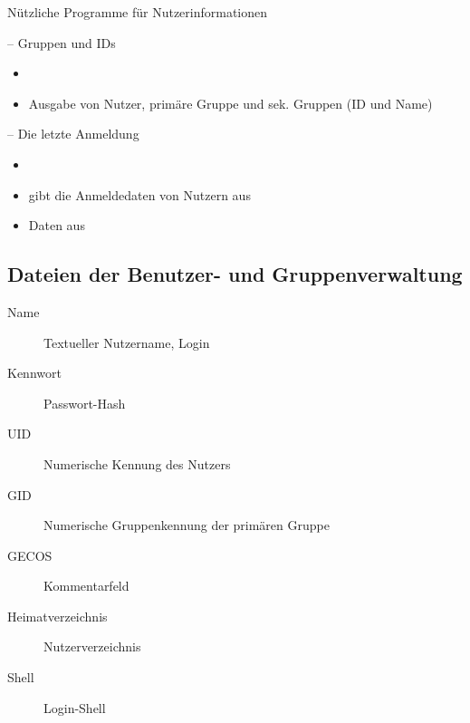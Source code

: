 \documentclass[aspectratio=43]{beamer}
\begin{document}
\begin{frame}{Nützliche Programme für Nutzerinformationen}
  
  \begin{block}{ -- Gruppen und IDs}
    \begin{itemize}
      \item {}
      \item Ausgabe von Nutzer, primäre Gruppe und sek. Gruppen (ID und Name)
    \end{itemize}
  \end{block}
    \begin{block}{ -- Die letzte Anmeldung}
    \begin{itemize}
      \item {}
      \item gibt die Anmeldedaten von Nutzern aus
      \item Daten aus 
    \end{itemize}
  \end{block}
\end{frame}


\subsection{Dateien der Benutzer- und Gruppenverwaltung}

\begin{frame}{}
  \begin{center}
    \colorbox{yellow}{}
  \end{center}
  \begin{block}{}
    \begin{description}
      \item[Name]        Textueller Nutzername, Login
      \item[Kennwort]    Passwort-Hash 
      \item[UID]         Numerische Kennung des  Nutzers
      \item[GID]         Numerische Gruppenkennung der primären Gruppe
      \item[GECOS]       Kommentarfeld
      \item[Heimatverzeichnis] Nutzerverzeichnis
      \item[Shell]       Login-Shell
    \end{description}
  \end{block}
\end{frame}
\end{document}
